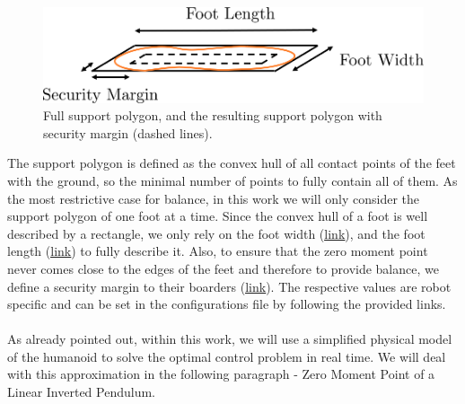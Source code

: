 \begin{figure}[h!]
	\centering
	\includegraphics[scale=.5]{chapters/02_background/img/support_polygon.png}
	\caption{Full support polygon, and the resulting support polygon with security margin (dashed lines).}
	\label{fig::211_support_polygon}
\end{figure}
The support polygon is defined as the convex hull of all contact points of the feet with the ground, so the minimal number of points to fully contain all of them. As the most restrictive case for balance, in this work we will only consider the support polygon of one foot at a time. Since the convex hull of a foot is well described by a rectangle, we only rely on the foot width (\href{https://github.com/mhubii/nmpc_pattern_generator/blob/bc79a6d4f9bcfd3794146355af44429f5b7a9fe0/libs/pattern_generator/configs.yaml#L14}{\underline{link}}), and the foot length (\href{https://github.com/mhubii/nmpc_pattern_generator/blob/bc79a6d4f9bcfd3794146355af44429f5b7a9fe0/libs/pattern_generator/configs.yaml#L15}{\underline{link}}) to fully describe it. Also, to ensure that the zero moment point never comes close to the edges of the feet and therefore to provide balance, we define a security margin to their boarders (\href{https://github.com/mhubii/nmpc_pattern_generator/blob/bc79a6d4f9bcfd3794146355af44429f5b7a9fe0/libs/pattern_generator/configs.yaml#L3}{\underline{link}}). The respective values are robot specific and can be set in the configurations file by following the provided links.
\\\\
As already pointed out, within this work, we will use a simplified physical model of the humanoid to solve the optimal control problem in real time. We will deal with this approximation in the following paragraph - Zero Moment Point of a Linear Inverted Pendulum.
\FloatBarrier
